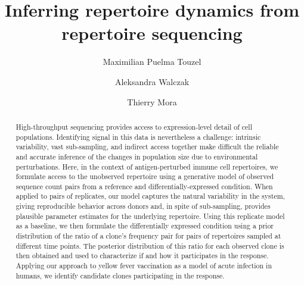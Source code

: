 \documentclass[letterpaper,english,prl,reprint,longbibliography]{revtex4-1} %
\begin{document}

\title{Inferring repertoire dynamics from repertoire sequencing}

\author{Maximilian Puelma Touzel}


\author{Aleksandra Walczak}


\author{Thierry Mora}


\vspace{0.5cm}

\begin{abstract}
High-throughput sequencing provides access to expression-level detail of cell populations. Identifying signal in this data is nevertheless a challenge: intrinsic variability, vast sub-sampling, and indirect access together make difficult the reliable and accurate inference of the changes in population size due to environmental perturbations. Here, in the context of antigen-perturbed immune cell repertoires, we formulate access to the unobserved repertoire using a generative model of observed sequence count pairs from a reference and differentially-expressed condition. When applied to pairs of replicates, our model captures the natural variability in the system, giving reproducible behavior across donors and, in spite of sub-sampling, provides plausible parameter estimates for the underlying repertoire. Using this replicate model as a baseline, we then formulate the differentially expressed condition using a prior distribution of the ratio of a clone’s frequency pair for pairs of repertoires sampled at different time points. The posterior distribution of this ratio for each observed clone is then obtained and used to characterize if and how it participates in the response. Applying our approach to yellow fever vaccination as a model of acute infection in humans, we identify candidate clones participating in the response.   

\end{abstract}


\pacs{}
\end{document}

